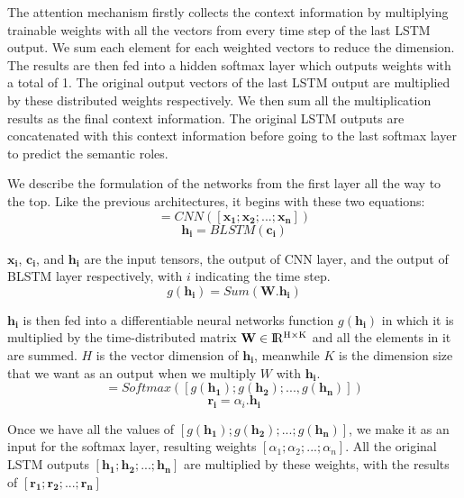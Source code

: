 The attention mechanism firstly collects the context information by multiplying trainable weights with all the vectors from every time step of the last LSTM output. We sum each element for each weighted vectors to reduce the dimension. The results are then fed into a hidden softmax layer which outputs weights with a total of 1. The original output vectors of the last LSTM output are multiplied by these distributed weights respectively. We then sum all the multiplication results as the final context information. The original LSTM outputs are concatenated with this context information before going to the last softmax layer to predict the semantic roles. 

We describe the formulation of the networks from the first layer all the way to the top. Like the previous architectures, it begins with these two equations:
\begin{equation}
[\mathbf{c_{1}}; \mathbf{c_{2}}; ...; \mathbf{c_{n}}] = CNN([\mathbf{x_{1}}; \mathbf{x_{2}}; ...; \mathbf{x_{n}}])
\end{equation}
\begin{equation}
\mathbf{h_{i}} = BLSTM(\mathbf{c_{i}})
\end{equation}

$\mathbf{x_{i}}$, $\mathbf{c_{i}}$, and $\mathbf{h_{i}}$ are the input tensors, the output of CNN layer, and the output of BLSTM layer respectively, with $i$ indicating the time step. 
\begin{equation}
\label{sum_weight}
g(\mathbf{h_{i}}) = Sum(\mathbf{W}.\mathbf{h_{i}})
\end{equation}

$\mathbf{h_{i}}$ is then fed into a differentiable neural networks function $g(\mathbf{h_{i}})$ in which it is multiplied by the time-distributed matrix $\textbf{W} \in {\rm I\!R^{H \times K}}$ and all the elements in it are summed. $H$ is the vector dimension of $\mathbf{h_{i}}$, meanwhile $K$ is the dimension size that we want as an output when we multiply \textbf{$W$} with $\mathbf{h_{i}}$.
\begin{equation}
[\alpha_{1}, \alpha_{2}, ..., \alpha_{n}] = Softmax([g(\mathbf{h_{1}}); g(\mathbf{h_{2}}); ..., g(\mathbf{h_{n}})])
\end{equation}
\begin{equation}
\mathbf{r_{i}} = \alpha_{i}.\mathbf{h_{i}}
\end{equation}

Once we have all the values of $[g(\mathbf{h_{1}}); g(\mathbf{h_{2}}); ...; g(\mathbf{h_{n}})]$, we make it as an input for the softmax layer, resulting weights $[\alpha_{1}; \alpha_{2}; ...; \alpha_{n}]$. All the original LSTM outputs $[\mathbf{h_{1}}; \mathbf{h_{2}}; ...; \mathbf{h_{n}}]$ are multiplied by these weights, with the results of $[\mathbf{r_{1}}; \mathbf{r_{2}}; ...; \mathbf{r_{n}}]$

